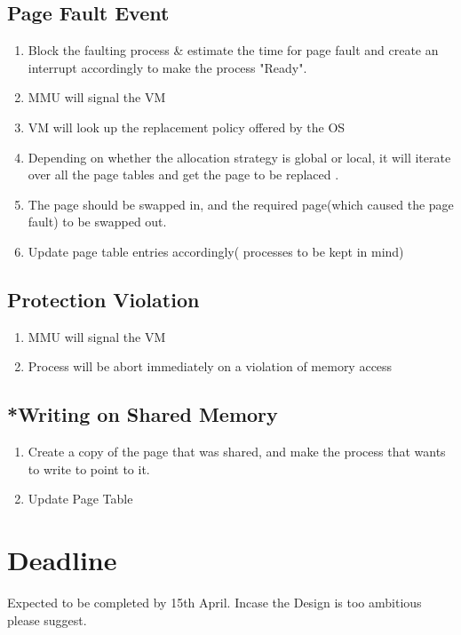 \documentclass[a4paper]{article}
\begin{document}
    \subsection{Page Fault Event}
        \begin{enumerate}
            \item Block the faulting process \& estimate the time for page fault and create an interrupt accordingly to make the process "Ready". 
            \item MMU will signal the VM 
            \item VM will look up the replacement policy offered by the OS
            \item Depending on whether the allocation strategy is global or local, it will iterate over all the page tables and get the page to be replaced .
            \item The page should be swapped in, and the required page(which caused the page fault) to be swapped out.
            \item Update page table entries accordingly( processes to be kept in mind)
        \end{enumerate}
     \subsection{Protection Violation}
        \begin{enumerate}
            \item MMU will signal the VM 
            \item Process will be abort immediately on a violation of memory access
        \end{enumerate}
        
     \subsection{*Writing on Shared Memory}
        \begin{enumerate}
            \item Create a copy of the page that was shared, and make the process that wants to write to point to it.
            \item Update Page Table
            
         \end{enumerate}
  



\section{Deadline}
    Expected to be completed by 15th April. Incase the Design is too ambitious please suggest.
    
\end{document}
